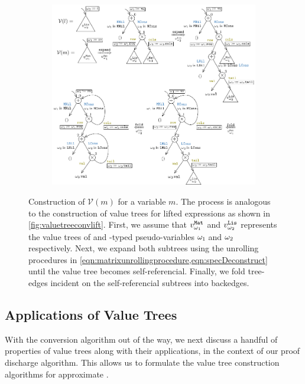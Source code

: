 \begin{figure}[p!]
\begin{subfigure}[b]{\textwidth}
\begin{center}
\includegraphics[scale=1.29]{chapters/figures/figValueTreeConvVar.pdf}
\end{center}
\end{subfigure}
\vspace{5px}
\caption{\label{fig:valuetreeconvvar}Construction of $\mathcal{V}(m)$ for a  variable $m$.
The process is analogous to the construction of value trees for lifted expressions as shown in \cref{fig:valuetreeconvlift}.
First, we assume that $v_{\omega_{1}\!}^{\tt Mat}$ and $v_{\omega_{2}\!}^{\tt Lis}$ represents the value trees of  and -typed
pseudo-variables ${\omega_{1}\!}$ and ${\omega_{2}\!}$ respectively.
Next, we expand both subtrees using the unrolling procedures in \cref{eqn:matrixunrollingprocedure,eqn:specDeconstruct} until
the value tree becomes self-referencial.
Finally, we fold tree-edges incident on the self-referencial subtrees into backedges.}
\end{figure}
\subsection{Applications of Value Trees}
\label{sec:valuetreeapps}
With the conversion algorithm out of the way, we next discuss a handful of properties of value trees along with
their applications, in the context of our proof discharge algorithm.
This allows us to formulate the value tree construction algorithms for approximate \recursiveRelations{}.

